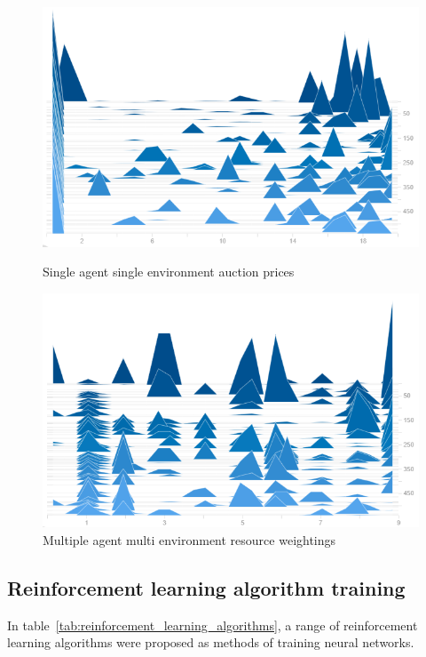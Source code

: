 \begin{figure}[h]
    \centering
    \begin{minipage}{0.5\textwidth}
        \centering
        \includegraphics[width=1.0\textwidth]{figures/4_test_eval_figs/env_training_fig/single_agent_single_env_auction_price.png}
        \caption{Single agent single environment auction prices}
        \label{fig:single_agent_single_env_auction_prices}
    \end{minipage}\hfill
    \begin{minipage}{0.5\textwidth}
        \centering
        \includegraphics[width=1.0\textwidth]{figures/4_test_eval_figs/env_training_fig/single_agent_single_env_weightings.png}
        \caption{Multiple agent multi environment resource weightings}
        \label{fig:single_agent_single_env_resource_weightings}
    \end{minipage}
\end{figure}

\subsection{Reinforcement learning algorithm training}\label{subsec:reinforcement-learning-algorithm-training}
In table~\ref{tab:reinforcement_learning_algorithms}, a range of reinforcement learning algorithms were proposed as
methods of training neural networks.

